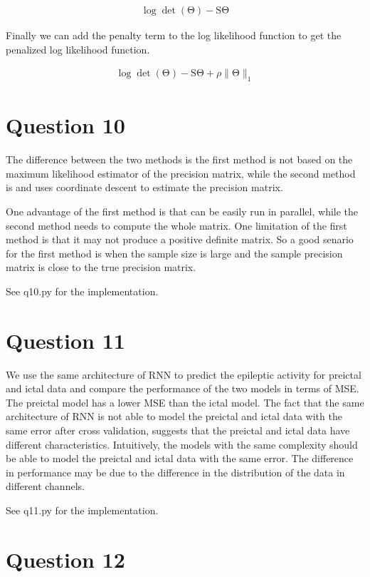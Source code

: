 \documentclass{article}
\newcommand{\vect}[1]{\boldsymbol{\mathrm{#1}}}
\begin{document}
\begin{align*}
  \log \det(\vect \Theta)- \vect S\vect \Theta
\end{align*}

Finally we can add the penalty term to the log likelihood function to get the penalized log likelihood function.

\begin{align*}
 \log \det(\vect \Theta)- \vect S\vect \Theta + \rho \|\vect \Theta\|_1
\end{align*}

\section*{Question 10}

The difference between the two methods is the first method is not based on the maximum likelihood estimator of the precision matrix, while the second method is and uses coordinate descent to estimate the precision matrix.

One advantage of the first method is that can be easily run in parallel, while the second method needs to compute the whole matrix. One limitation of the first method is that it may not produce a positive definite matrix. So a good senario for the first method is when the sample size is large and the sample precision matrix is close to the true precision matrix.

See q10.py for the implementation.

\section*{Question 11}
We use the same architecture of RNN to predict the epileptic activity for preictal and ictal data and compare the performance of the two models in terms of MSE. The preictal model has a lower MSE than the ictal model. The fact that the same architecture of RNN is not able to model the preictal and ictal data with the same error after cross validation, suggests that the preictal and ictal data have different characteristics. Intuitively, the models with the same complexity should be able to model the preictal and ictal data with the same error. The difference in performance may be due to the difference in the distribution of the data in different channels.

See q11.py for the implementation.

\section*{Question 12}
\end{document}
